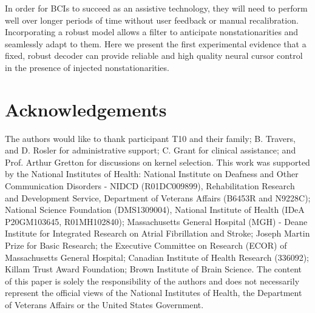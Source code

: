 In order for BCIs to succeed as an assistive technology, they will need to perform well over longer periods of time without user feedback or manual recalibration.  Incorporating a robust model allows a filter to anticipate nonstationarities and seamlessly adapt to them.  Here we present the first experimental evidence that a fixed, robust decoder can provide reliable and high quality neural cursor control in the presence of injected nonstationarities.

\section{Acknowledgements}

The authors would like to thank participant T10 and their family; B. Travers, and D. Rosler for administrative support; C. Grant for clinical assistance; and Prof. Arthur Gretton for discussions on kernel selection. This work was supported by the National Institutes of Health: National Institute on Deafness and Other Communication Disorders - NIDCD (R01DC009899), Rehabilitation Research and Development Service, Department of Veterans Affairs (B6453R and N9228C); National Science Foundation (DMS1309004), National Institute of Health (IDeA P20GM103645, R01MH102840); Massachusetts General Hospital (MGH) - Deane Institute for Integrated Research on Atrial Fibrillation and Stroke; Joseph Martin Prize for Basic Research; the Executive Committee on Research (ECOR) of Massachusetts General Hospital; Canadian Institute of Health Research (336092); Killam Trust Award Foundation; Brown Institute of Brain Science. The content of this paper is solely the responsibility of the authors and does not necessarily represent the official views of the National Institutes of Health, the Department of Veterans Affairs or the United States Government.

